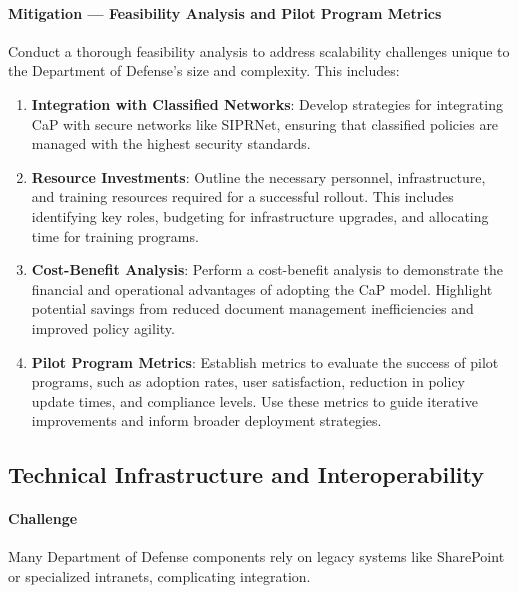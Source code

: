 \documentclass[11pt]{article}
\begin{document}
	\paragraph{Mitigation --- Feasibility Analysis and Pilot Program Metrics}
	Conduct a thorough feasibility analysis to address scalability challenges unique to the Department of Defense's size and complexity. This includes:
	\begin{enumerate}
		\item \textbf{Integration with Classified Networks}: Develop strategies for integrating CaP with secure networks like SIPRNet, ensuring that classified policies are managed with the highest security standards.
		\item \textbf{Resource Investments}: Outline the necessary personnel, infrastructure, and training resources required for a successful rollout. This includes identifying key roles, budgeting for infrastructure upgrades, and allocating time for training programs.
		\item \textbf{Cost-Benefit Analysis}: Perform a cost-benefit analysis to demonstrate the financial and operational advantages of adopting the CaP model. Highlight potential savings from reduced document management inefficiencies and improved policy agility.
		\item \textbf{Pilot Program Metrics}: Establish metrics to evaluate the success of pilot programs, such as adoption rates, user satisfaction, reduction in policy update times, and compliance levels. Use these metrics to guide iterative improvements and inform broader deployment strategies.
	\end{enumerate}

	\subsection{Technical Infrastructure and Interoperability}
	\paragraph{Challenge}
	Many Department of Defense components rely on legacy systems like SharePoint or specialized intranets, complicating integration.
\end{document}

